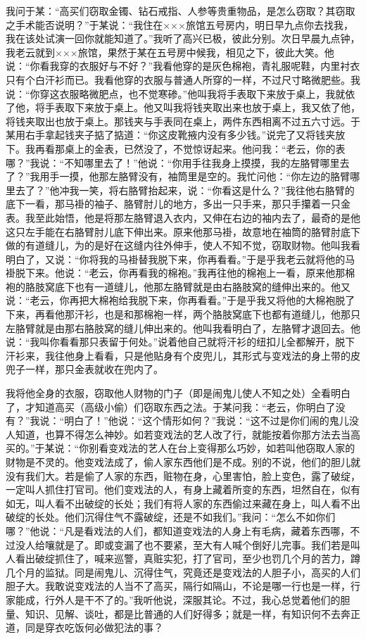 \documentclass[12pt,UTF8]{ctexbook}
\begin{document}
我问于某：“高买们窃取金镯、钻石戒指、人参等贵重物品，是怎么窃取？其窃取之手术能否说明？”于某说：“我住在×××旅馆五号房内，明日早九点你去找我，我在该处试演一回你就能知道了。”我听了高兴已极，彼此分别。次日早晨九点钟，我老云就到×××旅馆，果然于某在五号房中候我，相见之下，彼此大笑。他说：“你看我穿的衣服好与不好？”我看他穿的是灰色棉袍，青礼服呢鞋，内里衬衣只有个白汗衫而已。我看他穿的衣服与普通人所穿的一样，不过尺寸略微肥些。我说：“你穿这衣服略微肥点，也不觉寒碜。”他叫我将手表取下来放于桌上，我就依了他，将手表取下来放于桌上。他又叫我将钱夹取出来也放于桌上，我又依了他，将钱夹取出也放于桌上。那钱夹与手表同在桌上，两件东西相离不过五六寸远。于某用右手拿起钱夹子掂了掂道：“你这皮靴掖内没有多少钱。”说完了又将钱夹放下。我再看那桌上的金表，已然没了，不觉惊讶起来。他问我：“老云，你的表哪？”我说：“不知哪里去了！”他说：“你用手往我身上摸摸，我的左胳臂哪里去了？”我用手一摸，他那左胳臂没有，袖筒里是空的。我忙问他：“你左边的胳臂哪里去了？”他冲我一笑，将右胳臂抬起来，说：“你看这是什么？”我往他右胳臂的底下一看，那马褂的袖子、胳臂肘儿的地方，多出一只手来，那只手攥着一只金表。我至此始悟，他是将那左胳臂退入衣内，又伸在右边的袖内去了，最奇的是他这只左手能在右胳臂肘儿底下伸出来。原来他那马褂，故意地在袖筒的胳臂肘底下做的有道缝儿，为的是好在这缝内往外伸手，使人不知不觉，窃取财物。他叫我看明白了，又说：“你将我的马褂替我脱下来，你再看看。”于是乎我老云就将他的马褂脱下来。他说：“老云，你再看我的棉袍。”我再往他的棉袍上一看，原来他那棉袍的胳肢窝底下也有一道缝儿，他那左胳臂就是由右胳肢窝的缝伸出来的。他又说：“老云，你再把大棉袍给我脱下来，你再看看。”于是乎我又将他的大棉袍脱了下来，再看他那汗衫，也是和那棉袍一样，两个胳肢窝底下也都有道缝儿，他那只左胳臂就是由那右胳肢窝的缝儿伸出来的。他叫我看明白了，左胳臂才退回去。他说：“我叫你看看那只表留于何处。”说着他自己就将汗衫的纽扣儿全都解开，脱下汗衫来，我往他身上看看，只是他贴身有个皮兜儿，其形式与变戏法的身上带的皮兜子一样，那只金表就收在兜内了。

我将他全身的衣服，窃取他人财物的门子（即是闹鬼儿使人不知之处）全看明白了，才知道高买（高级小偷）们窃取东西之法。于某问我：“老云，你明白了没有？”我说：“明白了！”他说：“这个情形如何？”我说：“这不过是你们闹的鬼儿没人知道，也算不得怎么神妙。如若变戏法的艺人改了行，就能按着你那方法去当高买的。”于某说：“你别看变戏法的艺人在台上变得那么巧妙，如若叫他窃取人家的财物是不灵的。他变戏法成了，偷人家东西他们是不成。别的不说，他们的胆儿就没有我们大。若是偷了人家的东西，赃物在身，心里害怕，脸上变色，露了破绽，一定叫人抓住打官司。他们变戏法的人，有身上藏着所变的东西，坦然自在，似有如无，叫人看不出破绽的长处；我们有将人家的东西偷过来藏在身上，叫人看不出破绽的长处。他们沉得住气不露破绽，还是不如我们。”我问：“怎么不如你们哪？”他说：“凡是看戏法的人们，都知道变戏法的人身上有毛病，藏着东西哪，不过没人给嚷就是了。即或变漏了也不要紧，至大有人喊个倒好儿完事。我们若是叫人看出破绽抓住了，喊来巡警，真赃实犯，打了官司，至少也罚几个月的苦力，蹲几个月的监狱。同是闹鬼儿、沉得住气，究竟还是变戏法的人胆子小，高买的人们胆子大。我敢说变戏法的人当不了高买，隔行如隔山，不论是哪一行也是一样，行家能成，行外人是干不了的。”我听他说，深服其论。不过，我心总觉着他们的胆量、知识、见解、谈吐，都是比普通的人们好得多；就是一样，有知识何不去奔正道，同是穿衣吃饭何必做犯法的事？
\end{document}
